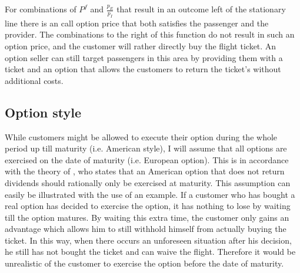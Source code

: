 For combinations of $P^f$ and $\frac{p_E}{p_I}$ that result in an outcome left of the stationary line there is an call option price that both satisfies the passenger and the provider. The combinations to the right of this function do not result in such an option price, and the customer will rather directly buy the flight ticket. An option seller can still target passengers in this area by providing them with a ticket and an option that allows the customers to return the ticket's without additional costs.

\subsection{Option style}
\label{sec:OptionStyle}
While customers might be allowed to execute their option during the whole period up till maturity (i.e. American style), I will assume that all options are exercised on the date of maturity (i.e. European option). This is in accordance with the theory of , who states that an American option that does not return dividends should rationally only be exercised at maturity. This assumption can easily be illustrated with the use of an example. If a customer who has bought a real option has decided to exercise the option, it has nothing to lose by waiting till the option matures. By waiting this extra time, the customer only gains an advantage which allows him to still withhold himself from actually buying the ticket. In this way, when there occurs an unforeseen situation after his decision, he still has not bought the ticket and can waive the flight. Therefore it would be unrealistic of the customer to exercise the option before the date of maturity.

